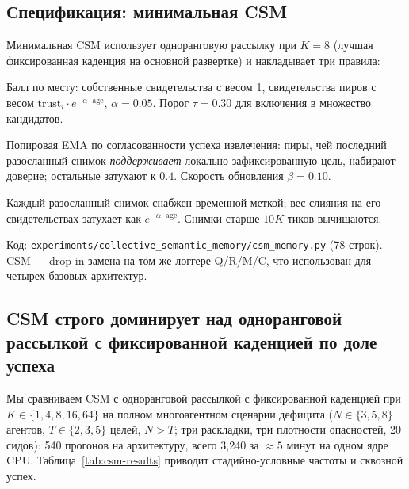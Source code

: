 \documentclass{article}
\begin{document}
\subsection{Спецификация: минимальная CSM}
Минимальная CSM использует одноранговую рассылку при $K{=}8$ (лучшая фиксированная каденция на основной развертке) и накладывает три правила:
\begin{description}[leftmargin=14pt,itemsep=1pt,topsep=2pt]
\item[\textit{Слияние.}] Балл по месту: собственные свидетельства с весом 1, свидетельства пиров с весом $\mathrm{trust}_i \cdot e^{-\alpha \cdot \mathrm{age}}$, $\alpha = 0.05$. Порог $\tau = 0.30$ для включения в множество кандидатов.
\item[\textit{Доверие.}] Попировая EMA по согласованности успеха извлечения: пиры, чей последний разосланный снимок \emph{поддерживает} локально зафиксированную цель, набирают доверие; остальные затухают к $0.4$. Скорость обновления $\beta = 0.10$.
\item[\textit{Устаревание.}] Каждый разосланный снимок снабжен временной меткой; вес слияния на его свидетельствах затухает как $e^{-\alpha\cdot\mathrm{age}}$. Снимки старше $10K$ тиков вычищаются.
\end{description}

Код: \texttt{experiments/collective\_semantic\_memory/csm\_memory.py} (78 строк). CSM --- drop-in замена на том же логгере Q/R/M/C, что использован для четырех базовых архитектур.

\subsection{CSM строго доминирует над одноранговой рассылкой с фиксированной каденцией по доле успеха}
Мы сравниваем CSM с одноранговой рассылкой с фиксированной каденцией при $K \in \{1, 4, 8, 16, 64\}$ на полном многоагентном сценарии дефицита ($N \in \{3,5,8\}$ агентов, $T \in \{2,3,5\}$ целей, $N>T$; три раскладки, три плотности опасностей, 20 сидов): 540 прогонов на архитектуру, всего 3{,}240 за $\approx 5$ минут на одном ядре CPU. Таблица~\ref{tab:csm-results} приводит стадийно-условные частоты и сквозной успех.
\end{document}
